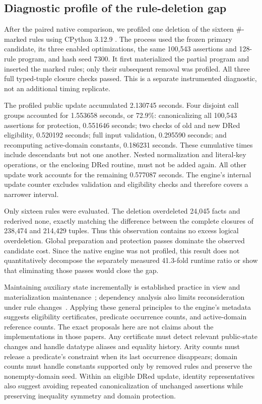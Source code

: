 \subsection{Diagnostic profile of the rule-deletion gap}
\label{sec:deletion-diagnostic}
After the paired native comparison, we profiled one deletion of the sixteen
$\#$-marked rules using CPython 3.12.9 . The process used the
frozen primary candidate, its three enabled optimizations, the same 100,543
assertions and 128-rule program, and hash seed 7300. It first materialized the
partial program and inserted the marked rules; only their subsequent removal
was profiled. All three full typed-tuple closure checks passed. This is a
separate instrumented diagnostic, not an additional timing replicate.

The profiled public update accumulated 2.130745 seconds. Four disjoint call
groups accounted for 1.553658 seconds, or 72.9\%: canonicalizing all 100,543
assertions for protection, 0.551646 seconds; two checks of old and new DRed
eligibility, 0.520192 seconds; full input validation, 0.295590 seconds; and
recomputing active-domain constants, 0.186231 seconds. These cumulative times
include descendants but not one another. Nested normalization and literal-key
operations, or the enclosing DRed routine, must not be added again. All other
update work accounts for the remaining 0.577087 seconds. The engine's internal
update counter excludes validation and eligibility checks and therefore covers
a narrower interval.

Only sixteen rules were evaluated. The deletion overdeleted 24,045 facts and
rederived none, exactly matching the difference between the complete closures
of 238,474 and 214,429 tuples. Thus this observation contains no excess logical
overdeletion. Global preparation and protection passes dominate the observed
candidate cost. Since the native engine was not profiled, this result does not
quantitatively decompose the separately measured 41.3-fold runtime ratio or
show that eliminating those passes would close the gap.

Maintaining auxiliary state incrementally is established practice in view and
materialization maintenance~\cite{gupta1993,motik2019}; dependency analysis also
limits reconsideration under rule changes~\cite{kotowski2011,xu2023}. Applying
these general principles to the engine's metadata suggests eligibility
certificates, predicate occurrence counts, and active-domain reference counts.
The exact proposals here are not claims about the implementations in those
papers. Any certificate must detect relevant public-state changes and handle
datatype aliases and equality history. Arity counts must release a predicate's
constraint when its last occurrence disappears; domain counts must handle
constants supported only by removed rules and preserve the nonempty-domain
seed. Within an eligible DRed update, identity representatives also suggest
avoiding repeated canonicalization of unchanged assertions while preserving
inequality symmetry and domain protection.

